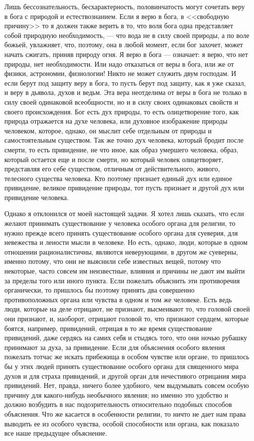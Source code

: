 \documentclass[12pt]{article}
\begin{document}
Лишь бессознательность, бесхарактерность, половинчатость могут сочетать веру в бога с природой и естествознанием. Если я верю в бога, в <<свободную причину>>  то я должен также верить в то, что воля бога одна представляет собой природную необходимость, --- что вода не в силу своей природы, а по воле божьей, увлажняет, что, поэтому, она в любой момент, если бог захочет, может начать сжигать, приняв природу огня. Я верю в бога --- означает: я верю, что нет природы, нет необходимости. Или надо отказаться от веры в бога, или же от физики, астрономии, физиологии! Никто не может служить двум господам. И если берут под защиту веру в бога, то пусть берут под защиту, как я уже сказал, и веру в дьявола, духов и ведьм. Эта вера неотделима от веры в бога не только в силу своей одинаковой всеобщности, но и в силу своих одинаковых свойств и своего происхождения. Бог есть дух природы, то есть олицетворение того, как природа отражается на духе человека, или духовное изображение природы человеком, которое, однако, он мыслит себе отдельным от природы и самостоятельным существом. Так же точно дух человека, который бродит после смерти, то есть привидение, не что иное, как образ умершего человека, образ, который остается еще и после смерти, но который человек олицетворяет, представляя его себе существом, отличным от действительного, живого, телесного существа человека. Кто поэтому признает единый дух или единое привидение, великое привидение природы, тот пусть признает и другой дух или привидение человека. 

Однако я отклонился от моей настоящей задачи. Я хотел лишь сказать, что если желают принимать существование у человека особого органа для религии, то нужно прежде всего принять существование особого органа для суеверия, для невежества и лености мысли в человеке. Но есть, однако, люди, которые в одном отношении рационалистичны, являются неверующими, в другом же суеверны, именно потому, что они не выяснили себе известных вещей, потому что некоторые, часто совсем им неизвестные, влияния и причины не дают им выйти за пределы того или иного пункта. Если пожелать объяснить эти противоречия органически, то пришлось бы поэтому принять два совершенно противоположных органа или чувства в одном и том же человеке. Есть ведь люди, которые на деле отрицают, не признают, высмеивают то, что головой своей они признают, и, наоборот, отрицают головой то, что признают сердцем, которые боятся, например, привидений, отрицая в то же время существование привидений, даже сердясь на самих себя и стыдясь того, что они ночью рубашку принимают за духа, за привидение. Если для объяснения особого явления пожелать тотчас же искать прибежища в особом чувстве или органе, то пришлось бы у этих людей принять существование особого органа для священного мира духов и для страха привидений, и другой орган для нечестивого отрицания мира привидений. Нет, правда, ничего более удобного, чем выдумывать совсем особую причину для какого-нибудь необычного явления; но именно это удобство и должно возбудить в нас подозрительность относительно подобных способов объяснения. Что же касается в особенности религии, то ничто не дает нам права выводить ее из особого чувства, особой способности или органа, как показало все наше предыдущее объяснение. 
\end{document}

